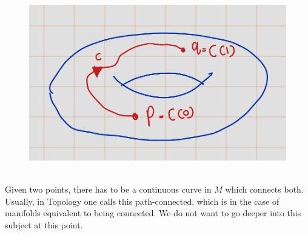 \documentclass[
]{book}
\theoremstyle{definition}
\theoremstyle{definition}
\theoremstyle{definition}
\theoremstyle{definition}
\theoremstyle{remark}
\begin{document}
\begin{figure}
\centering
\includegraphics{figures/ch1/fig08.png}
\caption{\label{fig:fig08}\(~\)}
\end{figure}

Given two points, there has to be a continuous curve in \(M\) which connects both. Usually, in Topology one calls this path-connected, which is in the case of manifolds equivalent to being connected. We do not want to go deeper into this subject at this point.

  
\end{document}
